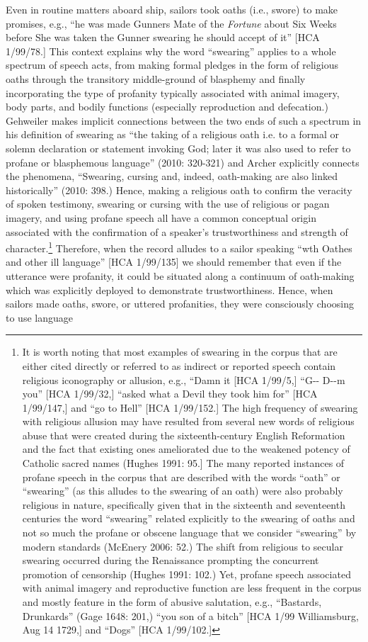 \documentclass[12pt]{article}
\newenvironment{styleStandard}{\renewcommand\baselinestretch{1.0}\setlength\leftskip{0cm}\setlength\rightskip{0cm plus 1fil}\setlength\parindent{0cm}\setlength\parfillskip{0pt plus 1fil}\setlength\parskip{0in plus 1pt}\writerlistparindent\writerlistleftskip\leavevmode\normalfont\normalsize\writerlistlabel\ignorespaces}{\unskip\vspace{0in plus 1pt}\par}
\newcommand\writerlistleftskip{}
\newcommand\writerlistparindent{}
\newcommand\writerlistlabel{}
\begin{document}
\begin{styleStandard}
Even in routine matters aboard ship, sailors took oaths (i.e., swore) to make promises, e.g., “he was made Gunners Mate of the \textit{Fortune }about Six Weeks before She was taken the Gunner swearing he should accept of it” [HCA 1/99/78.] This context explains why the word “swearing” applies to a whole spectrum of speech acts, from making formal pledges in the form of religious oaths through the transitory middle-ground of blasphemy and finally incorporating the type of profanity typically associated with animal imagery, body parts, and bodily functions (especially reproduction and defecation.) Gehweiler makes implicit connections between the two ends of such a spectrum in his definition of swearing as “the taking of a religious oath i.e. to a formal or solemn declaration or statement invoking God; later it was also used to refer to profane or blasphemous language” (2010: 320-321) and Archer explicitly connects the phenomena, “Swearing, cursing and, indeed, oath-making are also linked historically” (2010: 398.) Hence, making a religious oath to confirm the veracity of spoken testimony, swearing or cursing with the use of religious or pagan imagery, and using profane speech all have a common conceptual origin associated with the confirmation of a speaker’s trustworthiness and strength of character.\footnote{ It is worth noting that most examples of swearing in the corpus that are either cited directly or referred to as indirect or reported speech contain religious iconography or allusion, e.g., “Damn it [HCA 1/99/5,] “G-{}- D-{}-m you” [HCA 1/99/32,] “asked what a Devil they took him for” [HCA 1/99/147,] and “go to Hell” [HCA 1/99/152.] The high frequency of swearing with religious allusion may have resulted from several new words of religious abuse that were created during the sixteenth-century English Reformation and the fact that existing ones ameliorated due to the weakened potency of Catholic sacred names (Hughes 1991: 95.] The many reported instances of profane speech in the corpus that are described with the words “oath” or “swearing” (as this alludes to the swearing of an oath) were also probably religious in nature, specifically given that in the sixteenth and seventeenth centuries the word “swearing” related explicitly to the swearing of oaths and not so much the profane or obscene language that we consider “swearing” by modern standards (McEnery 2006: 52.) The shift from religious to secular swearing occurred during the Renaissance prompting the concurrent promotion of censorship (Hughes 1991: 102.) Yet, profane speech associated with animal imagery and reproductive function are less frequent in the corpus and mostly feature in the form of abusive salutation, e.g., “Bastards, Drunkards” (Gage 1648: 201,) “you son of a bitch” [HCA 1/99 Williamsburg, Aug 14 1729,] and “Dogs” [HCA 1/99/102.] } Therefore, when the record alludes to a sailor speaking “wth Oathes and other ill language” [HCA 1/99/135] we should remember that even if the utterance were profanity, it could be situated along a continuum of oath-making which was explicitly deployed to demonstrate trustworthiness. Hence, when sailors made oaths, swore, or uttered profanities, they were consciously choosing to use language 
\end{styleStandard}
\end{document}
